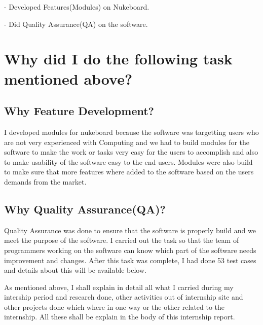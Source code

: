 - Developed Features(Modules) on Nukeboard.

- Did Quality Assurance(QA) on the software.


\section{Why did I do the following task mentioned above?}

\subsection{Why Feature Development?}

I developed modules for nukeboard because the software was targetting users who are not very experienced with Computing and we had to build modules for the software to make the work or tasks very easy for the users to accomplish and also to make usability of the software easy to the end users. Modules were also build to make sure that more features where added to the software based on the users demands from the market.

\subsection{Why Quality Assurance(QA)?}

Quality Assurance was done to ensure that the software is properly build and we meet the purpose of the software. I carried out the task so that the team of programmers working on the software can know which part of the software needs improvement and changes. After this task was complete, I had done 53 test cases and details about this will be available below.


As mentioned above, I shall explain in detail all what I carried during my intership period and research done, other activities out of internship site and other projects done which where in one way or the other related to the internship. All these shall be explain in the body of this internship report.